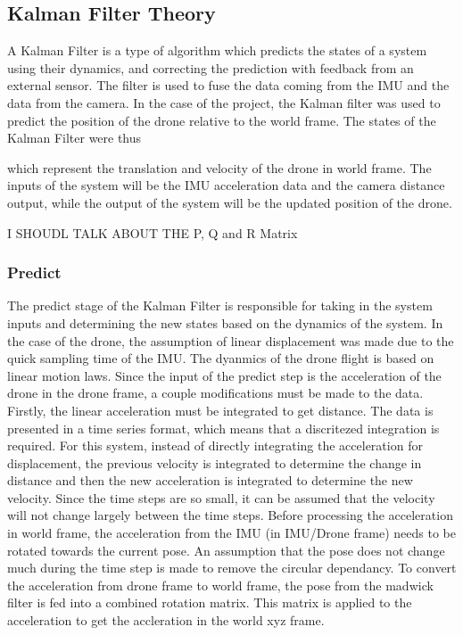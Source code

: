 \documentclass[bare_jrnl_transmag]{subfiles}
\begin{document}
\subsection{Kalman Filter Theory}
A Kalman Filter is a type of algorithm which predicts the states of a system using their dynamics, and correcting the prediction with feedback from an external sensor. The filter is used to fuse the data coming from the IMU and the data from the camera. 
In the case of the project, the Kalman filter was used to predict the position of the drone relative to the world frame. The states of the Kalman Filter were thus 

\begin{equation}[ t_x, t_y, t_z, v_x, v_y, v_z ]  \end{equation}  which represent the translation and velocity of the drone in world frame. 
The inputs of the system will be the IMU acceleration data and the camera distance output, while the output of the system will be the updated position of the drone.

I SHOUDL TALK ABOUT THE P, Q and R Matrix

\subsubsection{Predict}
The predict stage of the Kalman Filter is responsible for taking in the system inputs and determining the new states based on the dynamics of the system. In the case of the drone, the assumption of linear displacement was made due to the quick sampling time of the IMU. The dyanmics of the drone flight is based on linear motion laws. Since the input of the predict step is the acceleration of the drone in the drone frame, a couple modifications must be made to the data. Firstly, the linear acceleration must be integrated to get distance. The data is presented in a time series format, which means that a discritezed integration is required. For this system, instead of directly integrating the acceleration for displacement, the previous velocity is integrated to determine the change in distance and then the new acceleration is integrated to determine the new velocity. Since the time steps are so small, it can be assumed that the velocity will not change largely between the time steps. 
Before processing the acceleration in world frame, the acceleration from the IMU (in IMU/Drone frame) needs to be rotated towards the current pose. An assumption that the pose does not change much during the time step is made to remove the circular dependancy. To convert the acceleration from drone frame to world frame, the pose from the madwick filter is fed into a combined rotation matrix. This matrix is applied to the acceleration to get the accleration in the world xyz frame.
\end{document}
